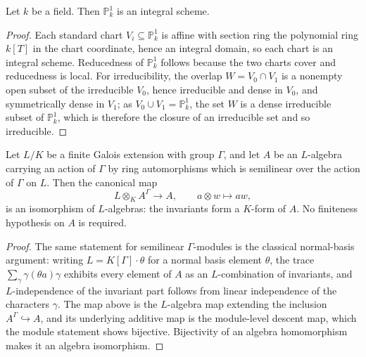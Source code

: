 \begin{lemma}\leanok
  \label{lem:p1_integral}
  Let \(k\) be a field. Then \(\mathbb{P}^1_k\) is an integral scheme.
\end{lemma}

\begin{proof}\leanok
  Each standard chart \(V_i \subseteq \mathbb{P}^1_k\) is affine with section
  ring the polynomial ring \(k[T]\) in the chart coordinate, hence an integral
  domain, so each chart is an integral scheme. Reducedness of \(\mathbb{P}^1_k\)
  follows because the two charts cover and reducedness is local. For
  irreducibility, the overlap \(W = V_0 \cap V_1\) is a nonempty open subset of
  the irreducible \(V_0\), hence irreducible and dense in \(V_0\), and
  symmetrically dense in \(V_1\); as \(V_0 \cup V_1 = \mathbb{P}^1_k\), the set
  \(W\) is a dense irreducible subset of \(\mathbb{P}^1_k\), which is therefore
  the closure of an irreducible set and so irreducible.
\end{proof}

\begin{theorem}\leanok
  \label{thm:speiser_descent}
  Let \(L/K\) be a finite Galois extension with group \(\Gamma\), and let \(A\)
  be an \(L\)-algebra carrying an action of \(\Gamma\) by ring automorphisms
  which is semilinear over the action of \(\Gamma\) on \(L\). Then the canonical
  map
  \[
    L \otimes_K A^\Gamma \longrightarrow A, \qquad a \otimes w \mapsto a w,
  \]
  is an isomorphism of \(L\)-algebras: the invariants form a \(K\)-form of
  \(A\). No finiteness hypothesis on \(A\) is required.
\end{theorem}

\begin{proof}\leanok
  The same statement for semilinear \(\Gamma\)-modules is the classical
  normal-basis argument: writing \(L = K[\Gamma] \cdot \theta\) for a normal
  basis element \(\theta\), the trace \(\sum_{\gamma} \gamma(\theta a) \gamma\)
  exhibits every element of \(A\) as an \(L\)-combination of invariants, and
  \(L\)-independence of the invariant part follows from linear independence of
  the characters \(\gamma\). The map above is the \(L\)-algebra map extending the
  inclusion \(A^\Gamma \hookrightarrow A\), and its underlying additive map is
  the module-level descent map, which the module statement shows bijective.
  Bijectivity of an algebra homomorphism makes it an algebra isomorphism.
\end{proof}

